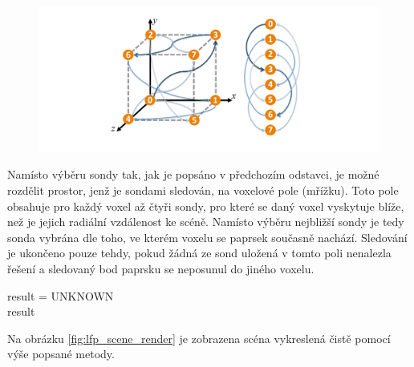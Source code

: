 \begin{figure}[H]
	\centering
	\includegraphics[scale=1]{images/probe_cube.png}
	\captionsetup{justification=centering}
	\label{fig:lfp_cube}
\end{figure}

Namísto výběru sondy tak, jak je popsáno v předchozím odstavci, je možné rozdělit prostor, jenž je sondami sledován, na voxelové pole (mřížku). Toto pole obsahuje pro každý voxel až čtyři sondy, pro které se daný voxel vyskytuje blíže, než je jejich radiální vzdálenost ke scéně. Namísto výběru nejbližší sondy je tedy sonda vybrána dle toho, ve kterém voxelu se paprsek současně nachází. Sledování je ukončeno pouze tehdy, pokud žádná ze sond uložená v tomto poli nenalezla řešení a sledovaný bod paprsku se neposunul do jiného voxelu. 

\begin{center}
	\begin{czechalgorithm}[H] \label{alg:light_field_trace}
	    result = UNKNOWN\\
	    \KwRet result
		\caption{Sledování paprsku skrze light field}
	\end{czechalgorithm}
\end{center}

Na obrázku \ref{fig:lfp_scene_render} je zobrazena scéna vykreslená čistě pomocí výše popsané metody.

